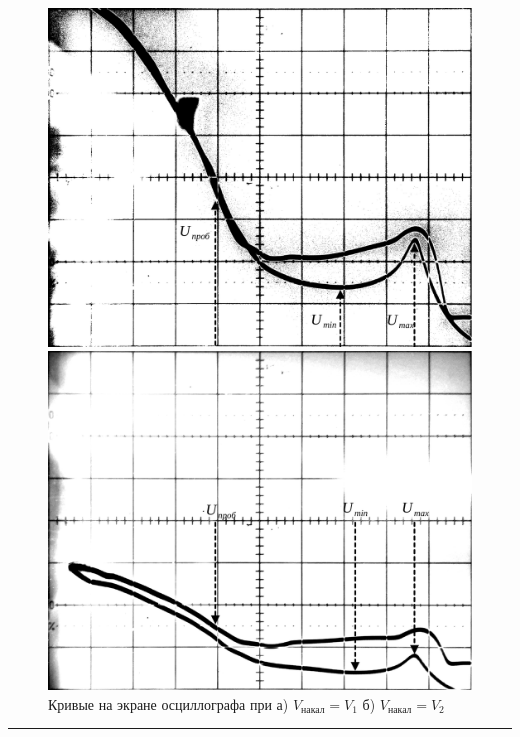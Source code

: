 \documentclass[a4paper,12pt]{article} %
\begin{document}
\begin{figure}
\centering
\begin{minipage}{0.49\textwidth}
\includegraphics[width=\textwidth]{scope_hv.pdf}
\end{minipage}
\begin{minipage}{0.49\textwidth}
\includegraphics[width=\textwidth]{scope_lv.pdf}
\end{minipage}
\caption{Кривые на экране осциллографа при а) $V_\text{накал} = V_1$ б) $V_\text{накал} = V_2$}
\label{fig:scope}
\end{figure}
\medskip\hrule\medskip
\end{document}
